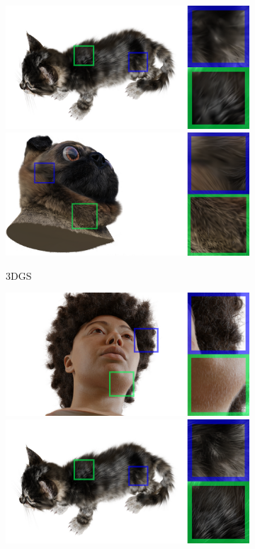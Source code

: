 \begin{figure}[tb]
\begin{subfigure}{0.31\linewidth}
  \includegraphics[width=\linewidth]{images/closeup/kitten_3dgs_67_detail.png}
  \includegraphics[width=\linewidth]{images/closeup/pug_3dgs_25_detail.png}
  \caption{3DGS~\cite{kerbl3Dgaussians}}
  \end{subfigure}
  \hfill
  \begin{subfigure}{0.31\linewidth}
  \includegraphics[width=\linewidth]{images/closeup/khady_rgb_22_detail.png}
  \includegraphics[width=\linewidth]{images/closeup/kitten_rgb_67_detail.png}

\end{subfigure}
\end{figure}
